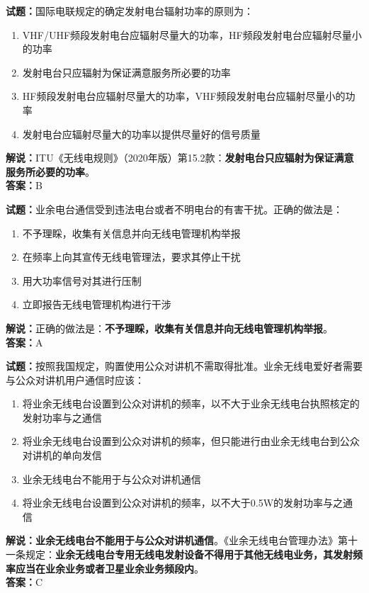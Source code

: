 \documentclass{ctexbook}
\begin{document}
\bigskip


\noindent\textbf{试题：}国际电联规定的确定发射电台辐射功率的原则为：
\begin{enumerate}[leftmargin=3em]
\item VHF/UHF频段发射电台应辐射尽量大的功率，HF频段发射电台应辐射尽量小的功率
\item 发射电台只应辐射为保证满意服务所必要的功率
\item HF频段发射电台应辐射尽量大的功率，VHF频段发射电台应辐射尽量小的功率
\item 发射电台应辐射尽量大的功率以提供尽量好的信号质量
\end{enumerate}
\noindent\textbf{解说：}ITU《无线电规则》（2020年版）第15.2款：\textbf{发射电台只应辐射为保证满意服务所必要的功率}。\\\noindent\textbf{答案：}B



\bigskip


\noindent\textbf{试题：}业余电台通信受到违法电台或者不明电台的有害干扰。正确的做法是：
\begin{enumerate}[leftmargin=3em]
\item 不予理睬，收集有关信息并向无线电管理机构举报
\item 在频率上向其宣传无线电管理法，要求其停止干扰
\item 用大功率信号对其进行压制
\item 立即报告无线电管理机构进行干涉
\end{enumerate}
\noindent\textbf{解说：}正确的做法是：\textbf{不予理睬，收集有关信息并向无线电管理机构举报}。\\\noindent\textbf{答案：}A



\bigskip


\noindent\textbf{试题：}按照我国规定，购置使用公众对讲机不需取得批准。业余无线电爱好者需要与公众对讲机用户通信时应该：
\begin{enumerate}[leftmargin=3em]
\item 将业余无线电台设置到公众对讲机的频率，以不大于业余无线电台执照核定的发射功率与之通信
\item 将业余无线电台设置到公众对讲机的频率，但只能进行由业余无线电台到公众对讲机的单向发信
\item 业余无线电台不能用于与公众对讲机通信
\item 将业余无线电台设置到公众对讲机的频率，以不大于0.5W的发射功率与之通信
\end{enumerate}
\noindent\textbf{解说：}\textbf{业余无线电台不能用于与公众对讲机通信}。《业余无线电台管理办法》第十一条规定：\textbf{业余无线电台专用无线电发射设备不得用于其他无线电业务，其发射频率应当在业余业务或者卫星业余业务频段内}。\\\noindent\textbf{答案：}C
\end{document}
